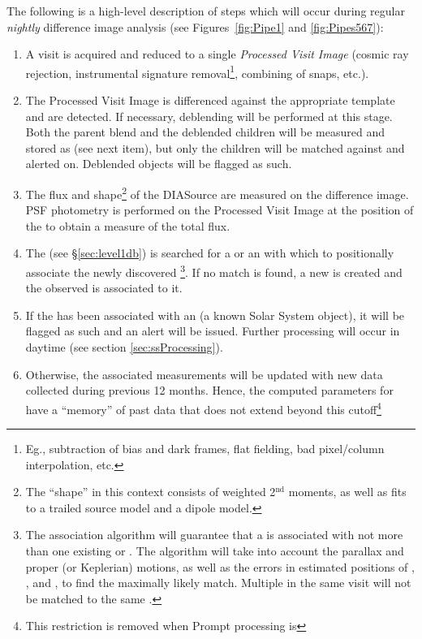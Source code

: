 \documentclass[SE,lsstdraft,toc]{lsstdoc}
\begin{document}
The following is a high-level description of steps which will occur during regular \emph{nightly}
difference image analysis (see Figures~\ref{fig:Pipe1} and \ref{fig:Pipes567}):
\begin{enumerate}
\item A visit is acquired and reduced to a single \emph{Processed Visit Image} (cosmic ray rejection, instrumental signature removal\footnote{Eg., subtraction of bias and dark frames, flat fielding, bad pixel/column interpolation, etc.}, combining of snaps, etc.).
\item The Processed Visit Image is differenced against the appropriate template and \DIASources are detected. If necessary, deblending will be performed at this stage. Both the parent blend and the deblended children will be measured and stored as \DIASources (see next item), but only the children will be matched against \DIAObjects and alerted on. Deblended objects will be flagged as such.
\item The flux and shape\footnote{The ``shape'' in this context consists of weighted 2$^\mathrm{nd}$ moments, as well as fits to a trailed source model and a dipole model.} of the DIASource are measured on the difference image. PSF photometry is performed on the Processed Visit Image at the position of the \DIASource to obtain a measure of the total flux.
\item The \DB (see \S \ref{sec:level1db}) is searched for a \DIAObject or an \SSObject with which to positionally associate the newly discovered \DIASource\footnote{The association algorithm will guarantee that a \DIASource is associated with not more than one existing \DIAObject or \SSObject. The algorithm will take into account the parallax and proper (or Keplerian) motions, as well as the errors in estimated positions of \DIAObject, \SSObject, and \DIASource, to find the maximally likely match. Multiple \DIASources in the same visit will not be matched to the same \DIAObject.}. If no match is found, a new \DIAObject is created and the observed \DIASource is associated to it.
\item If the \DIASource has been associated with an \SSObject (a known Solar System object), it will be flagged as such and an alert will be issued. Further processing will occur in daytime (see section \ref{sec:ssProcessing}).
\item Otherwise, the associated \DIAObject measurements will be updated with new data
collected during previous 12 months. Hence, the computed parameters for \DIAObjects have a ``memory'' of past data that does not extend beyond this cutoff\footnote{This restriction is removed when Prompt processing is
}
\end{enumerate}
\end{document}
